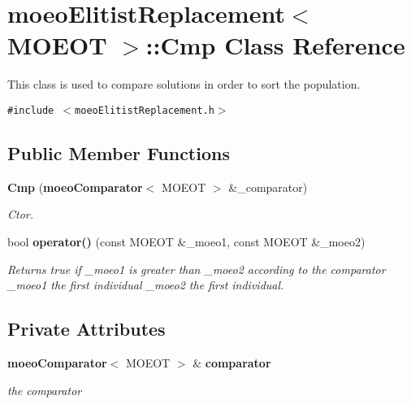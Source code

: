 \section{moeo\-Elitist\-Replacement$<$ MOEOT $>$::Cmp Class Reference}
\label{classmoeoElitistReplacement_1_1Cmp}
This class is used to compare solutions in order to sort the population.  


{\tt \#include $<$moeo\-Elitist\-Replacement.h$>$}

\subsection*{Public Member Functions}
\begin{CompactItemize}
\item 
{\bf Cmp} ({\bf moeo\-Comparator}$<$ MOEOT $>$ \&\_\-comparator)
\begin{CompactList}\small\item\em Ctor. \item\end{CompactList}\item 
bool {\bf operator()} (const MOEOT \&\_\-moeo1, const MOEOT \&\_\-moeo2)\label{classmoeoElitistReplacement_1_1Cmp_2411b927dde02225114635e776ce863f}

\begin{CompactList}\small\item\em Returns true if \_\-moeo1 is greater than \_\-moeo2 according to the comparator \_\-moeo1 the first individual \_\-moeo2 the first individual. \item\end{CompactList}\end{CompactItemize}
\subsection*{Private Attributes}
\begin{CompactItemize}
\item 
{\bf moeo\-Comparator}$<$ MOEOT $>$ \& {\bf comparator}\label{classmoeoElitistReplacement_1_1Cmp_d86031360b8b2754431c3de650651a92}

\begin{CompactList}\small\item\em the comparator \item\end{CompactList}\end{CompactItemize}


